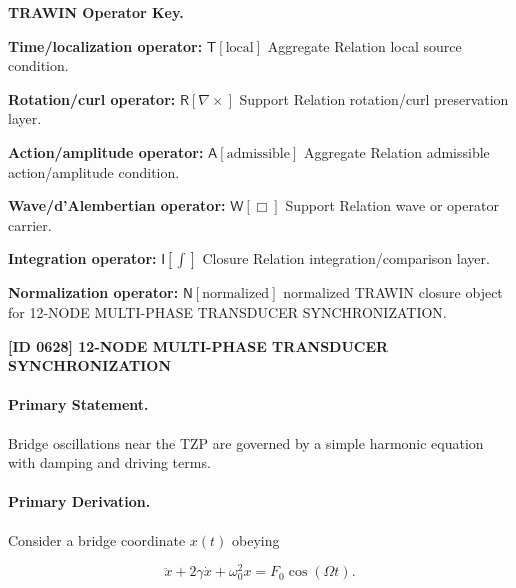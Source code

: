 \par\vspace{0.45\baselineskip}
\noindent\begin{minipage}[t]{\linewidth}
\begingroup
\small
\raggedright
\textbf{TRAWIN Operator Key.}\par
\noindent\textbf{Time/localization operator:} $\mathsf{T}\!\left[\mathrm{local}\right]$ Aggregate Relation local source condition.\par
\noindent\textbf{Rotation/curl operator:} $\mathsf{R}\!\left[\nabla\times\right]$ Support Relation rotation/curl preservation layer.\par
\noindent\textbf{Action/amplitude operator:} $\mathsf{A}\!\left[\mathrm{admissible}\right]$ Aggregate Relation admissible action/amplitude condition.\par
\noindent\textbf{Wave/d'Alembertian operator:} $\mathsf{W}\!\left[\Box\right]$ Support Relation wave or operator carrier.\par
\noindent\textbf{Integration operator:} $\mathsf{I}\!\left[\int\right]$ Closure Relation integration/comparison layer.\par
\noindent\textbf{Normalization operator:} $\mathsf{N}\!\left[\mathrm{normalized}\right]$ normalized TRAWIN closure object for 12-NODE MULTI-PHASE TRANSDUCER SYNCHRONIZATION.\par
\endgroup
\end{minipage}

\clearpage
\noindent\textbf{[ID 0628] 12-NODE MULTI-PHASE TRANSDUCER SYNCHRONIZATION}\par
\vspace{0.35em}
\paragraph{Primary Statement.}

Bridge oscillations near the TZP are governed by a simple harmonic equation with damping and driving terms.

\paragraph{Primary Derivation.}

Consider a bridge coordinate $x(t)$ obeying

\begin{equation}
\ddot{x} + 2\gamma\dot{x} + \omega_0^2 x = F_0\cos(\Omega t).
\end{equation}

